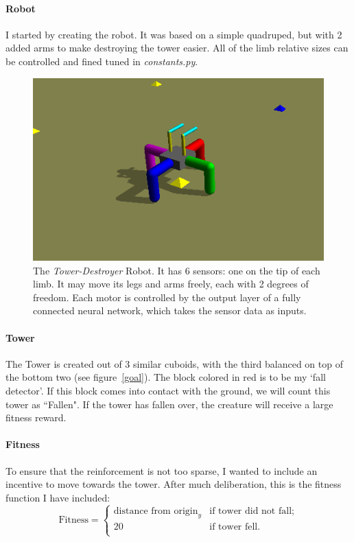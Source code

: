\documentclass[12pt, a4paper]{article}
\begin{document}
\paragraph{Robot}
I started by creating the robot. It was based on a simple quadruped, but with 2 added arms to make destroying the tower easier. All of the limb relative sizes can be controlled and fined tuned in \emph{constants.py}.\par
\begin{figure}[h]
\includegraphics{robot.png}
\caption{The \emph{Tower-Destroyer} Robot. It has 6 sensors: one on the tip of each limb. It may move its legs and arms freely, each with 2 degrees of freedom. Each motor is controlled by the output layer of a fully connected neural network, which takes the sensor data as inputs. }
\end{figure}
\paragraph{Tower}
The Tower is created out of 3 similar cuboids, with the third balanced on top of the bottom two (see figure~\ref{goal}). The block colored in red is to be my `fall detector'. If this block comes into contact with the ground, we will count this tower as ``Fallen". If the tower has fallen over, the creature will receive a large fitness reward.
\paragraph{Fitness} To ensure that the reinforcement is not too sparse, I wanted to include an incentive to move towards the tower. After much deliberation, this is the fitness function I have included:
$$
\text{Fitness} = \begin{cases}
\text{distance from origin}_y & \text{if tower did not fall};\\
20 & \text{if tower fell.}\\
\end{cases}
$$
\end{document}
